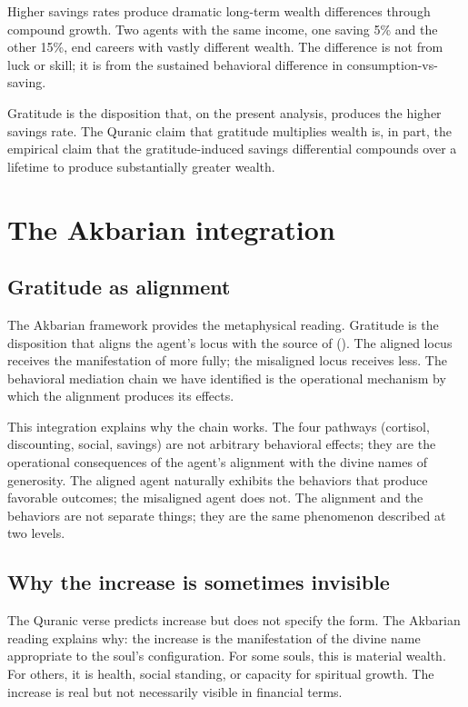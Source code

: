 Higher savings rates produce dramatic long-term wealth differences
through compound growth. Two agents with the same income, one
saving 5\% and the other 15\%, end careers with vastly different
wealth. The difference is not from luck or skill; it is from the
sustained behavioral difference in consumption-vs-saving.

Gratitude is the disposition that, on the present analysis,
produces the higher savings rate. The Quranic claim that gratitude
multiplies wealth is, in part, the empirical claim that the
gratitude-induced savings differential compounds over a lifetime
to produce substantially greater wealth.

\section{The Akbarian integration}
\label{sec:grat-akbarian}

\subsection{Gratitude as alignment}

The Akbarian framework provides the metaphysical reading.
Gratitude is the disposition that aligns the agent's locus with
the source of  (). The
aligned locus receives the manifestation of  more
fully; the misaligned locus receives less. The behavioral
mediation chain we have identified is the operational mechanism by
which the alignment produces its effects.

This integration explains why the chain works. The four pathways
(cortisol, discounting, social, savings) are not arbitrary
behavioral effects; they are the operational consequences of the
agent's alignment with the divine names of generosity. The aligned
agent naturally exhibits the behaviors that produce favorable
outcomes; the misaligned agent does not. The alignment and the
behaviors are not separate things; they are the same phenomenon
described at two levels.

\subsection{Why the increase is sometimes invisible}

The Quranic verse predicts increase but does not specify the
form. The Akbarian reading explains why: the increase is the
manifestation of the divine name appropriate to the soul's
configuration. For some souls, this is material wealth. For
others, it is health, social standing, or capacity for spiritual
growth. The increase is real but not necessarily visible in
financial terms.

